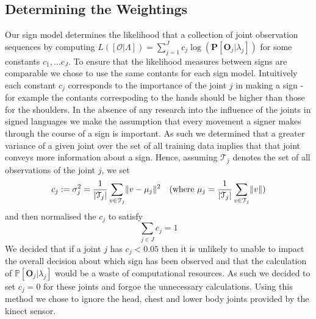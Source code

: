 \subsection{Determining the Weightings}
Our sign model determines the likelihood that a collection of joint observation sequences by computing $L([\mathcal{O} | \Lambda ]) = \sum_{j=1}^{J} c_j \log(\mathbf{P}[\mathbf{O}_j | \lambda_j])$ for some constants $c_1, \dots c_J$. To ensure that the likelihood measures between signs are comparable we chose to use the same contants for each sign model. Intuitively each constant $c_j$ corresponds to the importance of the joint $j$ in making a sign - for example the contants correspoding to the hands should be higher than those for the shoulders. In the absence of any research into the influence of the joints in signed languages we make the assumption that every movement a signer makes through the course of a sign is important. As such we determined that a greater variance of a given joint over the set of all training data implies that that joint conveys more information about a sign. Hence, assuming $\mathcal{T}_j$ denotes the set of all observations of the joint $j$, we set
\begin{align*}
c_j := \sigma^2_j &= \frac{1}{\lvert\mathcal{T}_j\rvert}\sum_{v \in \mathcal{T}_j} \lVert v - \mu_j\rVert^2 &(\text{where } \mu_j = \frac{1}{\lvert\mathcal{T}_j\rvert}\sum_{v \in\mathcal{T}_j}\lVert v\rVert)
\end{align*}
and then normalised the $c_j$ to satisfy
\begin{equation*}
\sum_{j \in J} c_j = 1
\end{equation*}
We decided that if a joint $j$ has $c_j < 0.05$ then it is unlikely to unable to impact the overall decision about which sign has been observed and that the calculation of $\mathbb{P}[\mathbf{O}_j | \lambda_j]$ would be a waste of computational resources. As such we decided to set $c_j = 0$ for these joints and forgoe the unnecessary calculations. Using this method we chose to ignore the head, chest and lower body joints provided by the kinect sensor.

